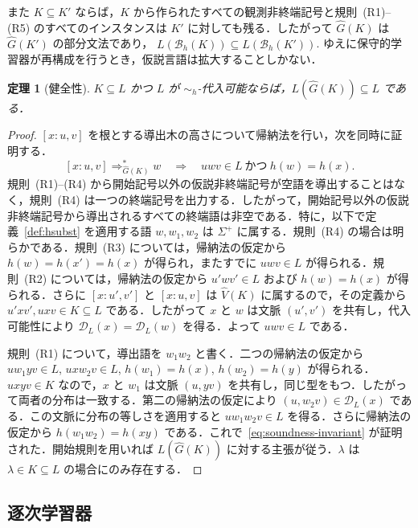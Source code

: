 \documentclass[11pt,a4paper]{ltjsarticle}
\newtheorem{theorem}{定理}[section]
\theoremstyle{remark}
\theoremstyle{plain}
\newcommand{\D}{\mathcal{D}}
\begin{document}
また $K\subseteq K'$ ならば，$K$ から作られたすべての観測非終端記号と規則~(R1)--(R5) のすべてのインスタンスは $K'$ に対しても残る．したがって $\widehat G(K)$ は $\widehat G(K')$ の部分文法であり，
$L(\mathcal B_h(K))\subseteq L(\mathcal B_h(K'))$.
ゆえに保守的学習器が再構成を行うとき，仮説言語は拡大することしかない．

\begin{theorem}[健全性]\label{thm:soundness}
$K\subseteq L$ かつ $L$ が $\sim_h$-代入可能ならば，$L(\widehat G(K))\subseteq L$ である．
\end{theorem}

\begin{proof}
$[x:u,v]$ を根とする導出木の高さについて帰納法を行い，次を同時に証明する．
\begin{equation}\label{eq:soundness-invariant}
 [x:u,v]\Rightarrow_{\widehat G(K)}^*w
 \quad\Longrightarrow\quad
 uwv\in L\ \text{かつ}\ h(w)=h(x).
\end{equation}
規則~(R1)--(R4) から開始記号以外の仮説非終端記号が空語を導出することはなく，規則~(R4) は一つの終端記号を出力する．したがって，開始記号以外の仮説非終端記号から導出されるすべての終端語は非空である．特に，以下で定義~\ref{def:hsubst} を適用する語 $w,w_1,w_2$ は $\Sigma^+$ に属する．規則~(R4) の場合は明らかである．規則~(R3) については，帰納法の仮定から $h(w)=h(x')=h(x)$ が得られ，またすでに $uwv\in L$ が得られる．規則~(R2) については，帰納法の仮定から $u'wv'\in L$ および $h(w)=h(x)$ が得られる．さらに $[x:u',v']$ と $[x:u,v]$ は $\widehat V(K)$ に属するので，その定義から $u'xv',uxv\in K\subseteq L$ である．したがって $x$ と $w$ は文脈 $(u',v')$ を共有し，代入可能性により $\D_L(x)=\D_L(w)$ を得る．よって $uwv\in L$ である．

規則~(R1) について，導出語を $w_1w_2$ と書く．二つの帰納法の仮定から
$uw_1yv\in L$, $uxw_2v\in L$,
$h(w_1)=h(x)$, $h(w_2)=h(y)$
が得られる．$uxyv\in K$ なので，$x$ と $w_1$ は文脈 $(u,yv)$ を共有し，同じ型をもつ．したがって両者の分布は一致する．第二の帰納法の仮定により $(u,w_2v)\in\D_L(x)$ である．この文脈に分布の等しさを適用すると $uw_1w_2v\in L$ を得る．さらに帰納法の仮定から $h(w_1w_2)=h(xy)$ である．これで~\eqref{eq:soundness-invariant} が証明された．開始規則を用いれば $L(\widehat G(K))$ に対する主張が従う．$\lambda$ は $\lambda\in K\subseteq L$ の場合にのみ存在する．
\end{proof}

\subsection{逐次学習器}
\end{document}

